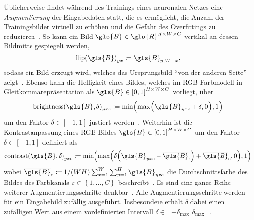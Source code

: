 Üblicherweise findet während des Trainings eines neuronalen Netzes eine \emph{Augmentierung} der Eingabedaten statt, die es ermöglicht, die Anzahl der Trainingsbilder virtuell zu erhöhen und die Gefahr des Overfittings zu reduzieren~\cite{tensorflow}.
So kann \zB{} ein Bild $\gls{B} \in \gls{R}^{H \times W \times C}$ vertikal an dessen Bildmitte gespiegelt werden, \dhe{}
\begin{equation*}
  {\mathrm{flip}\left(\gls{B}\right)}_{yx} \coloneqq \gls{B}_{y,W-x},
\end{equation*}
sodass ein Bild erzeugt wird, welches das Ursprungsbild \enquote{von der anderen Seite} zeigt~\cite{tensorflow}.
Ebenso kann die Helligkeit eines Bildes, welches im RGB-Farbmodell in Gleitkommarepräsentation als $\gls{B} \in {\left[0, 1\right]}^{H \times W \times C}$ vorliegt, über
\begin{equation*}
  {\mathrm{brightness}\left(\gls{B}, \delta \right)}_{yxc} \coloneqq \min \left( \max \left(\gls{B}_{yxc} + \delta, 0\right), 1\right)
\end{equation*}
um den Faktor $\delta \in \left[-1, 1\right]$ justiert werden~\cite{tensorflow}.
Weiterhin ist die Kontrastanpassung eines RGB-Bildes $\gls{B} \in {\left[0, 1\right]}^{H \times W \times C}$ um den Faktor $\delta \in \left[-1, 1\right]$ definiert als
\begin{equation*}
  {\mathrm{contrast}\left(\gls{B}, \delta\right)}_{yxc} \coloneqq \min \left( \max \left(\delta \left(\gls{B}_{yxc} - \overline{\gls{B}}_c\right) + \overline{\gls{B}}_c, 0\right), 1 \right)
\end{equation*}
wobei $\overline{\gls{B}}_c \coloneqq 1/\left(WH\right) \sum_{x = 1}^W \sum_{y = 1}^H \gls{B}_{yxc}$ die Durchschnittsfarbe des Bildes \bzgl{} des Farbkanals $c \in \left\{1, \ldots, C\right\}$ beschreibt~\cite{tensorflow}.
Es sind eine ganze Reihe weiterer Augmentierungsschritte denkbar~\cite{tensorflow}.
Alle Augmentierungsschritte werden für ein Eingabebild zufällig ausgeführt.
Insbesondere erhält $\delta$ dabei einen zufälligen Wert aus einem vordefinierten Intervall $\delta \in \left[-\delta_{\max}, \delta_{\max}\right]$.

